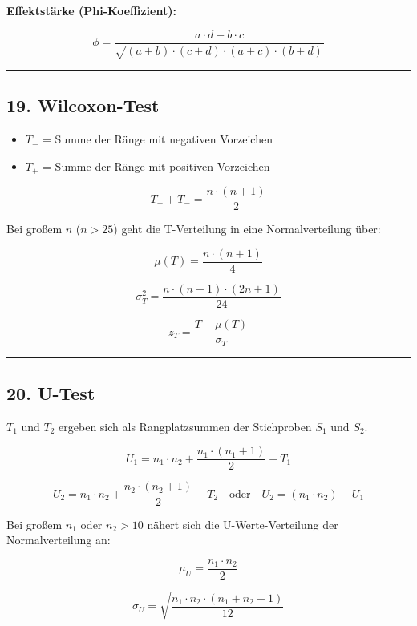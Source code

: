 \documentclass[
]{article}
\providecommand{\tightlist}{%
  \setlength{\itemsep}{0pt}\setlength{\parskip}{0pt}}
\begin{document}
\textbf{Effektstärke (Phi-Koeffizient):}

\[\phi = \frac{a \cdot d - b \cdot c}{\sqrt{(a+b) \cdot (c+d) \cdot (a+c) \cdot (b+d)}}\]

\begin{center}\rule{0.5\linewidth}{0.5pt}\end{center}

\subsection{19. Wilcoxon-Test}\label{wilcoxon-test}

\begin{itemize}
\tightlist
\item
  \(T_{-}\) = Summe der Ränge mit negativen Vorzeichen
\item
  \(T_{+}\) = Summe der Ränge mit positiven Vorzeichen
\end{itemize}

\[T_{+} + T_{-} = \frac{n \cdot (n + 1)}{2}\]

Bei großem \(n\) (\(n > 25\)) geht die T-Verteilung in eine
Normalverteilung über:

\[\mu(T) = \frac{n \cdot (n + 1)}{4}\]

\[\sigma_T^2 = \frac{n \cdot (n + 1) \cdot (2n + 1)}{24}\]

\[z_T = \frac{T - \mu(T)}{\sigma_T}\]

\begin{center}\rule{0.5\linewidth}{0.5pt}\end{center}

\subsection{20. U-Test}\label{u-test}

\(T_1\) und \(T_2\) ergeben sich als Rangplatzsummen der Stichproben
\(S_1\) und \(S_2\).

\[U_1 = n_1 \cdot n_2 + \frac{n_1 \cdot (n_1 + 1)}{2} - T_1\]

\[U_2 = n_1 \cdot n_2 + \frac{n_2 \cdot (n_2 + 1)}{2} - T_2 \quad \text{oder} \quad U_2 = (n_1 \cdot n_2) - U_1\]

Bei großem \(n_1\) oder \(n_2 > 10\) nähert sich die U-Werte-Verteilung
der Normalverteilung an:

\[\mu_U = \frac{n_1 \cdot n_2}{2}\]

\[\sigma_U = \sqrt{\frac{n_1 \cdot n_2 \cdot (n_1 + n_2 + 1)}{12}}\]
\end{document}
